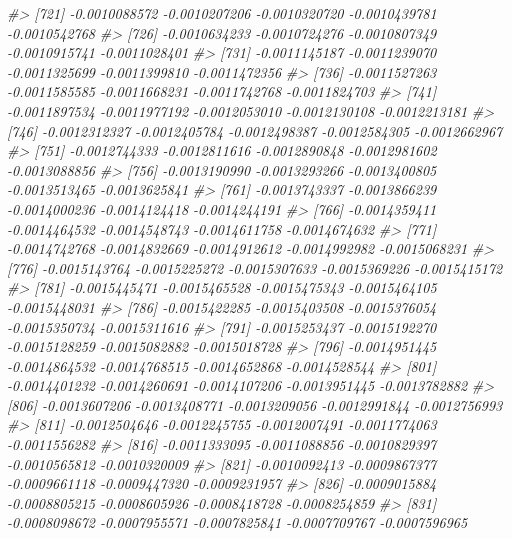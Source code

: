 \documentclass[
]{article}
\newenvironment{Shaded}{\begin{snugshade}}{\end{snugshade}}
\newcommand{\CommentTok}[1]{\textcolor[rgb]{0.56,0.35,0.01}{\textit{#1}}}
\begin{document}
\begin{Shaded}
\begin{Highlighting}[]
\CommentTok{\#\textgreater{} [721] {-}0.0010088572 {-}0.0010207206 {-}0.0010320720 {-}0.0010439781 {-}0.0010542768}
\CommentTok{\#\textgreater{} [726] {-}0.0010634233 {-}0.0010724276 {-}0.0010807349 {-}0.0010915741 {-}0.0011028401}
\CommentTok{\#\textgreater{} [731] {-}0.0011145187 {-}0.0011239070 {-}0.0011325699 {-}0.0011399810 {-}0.0011472356}
\CommentTok{\#\textgreater{} [736] {-}0.0011527263 {-}0.0011585585 {-}0.0011668231 {-}0.0011742768 {-}0.0011824703}
\CommentTok{\#\textgreater{} [741] {-}0.0011897534 {-}0.0011977192 {-}0.0012053010 {-}0.0012130108 {-}0.0012213181}
\CommentTok{\#\textgreater{} [746] {-}0.0012312327 {-}0.0012405784 {-}0.0012498387 {-}0.0012584305 {-}0.0012662967}
\CommentTok{\#\textgreater{} [751] {-}0.0012744333 {-}0.0012811616 {-}0.0012890848 {-}0.0012981602 {-}0.0013088856}
\CommentTok{\#\textgreater{} [756] {-}0.0013190990 {-}0.0013293266 {-}0.0013400805 {-}0.0013513465 {-}0.0013625841}
\CommentTok{\#\textgreater{} [761] {-}0.0013743337 {-}0.0013866239 {-}0.0014000236 {-}0.0014124418 {-}0.0014244191}
\CommentTok{\#\textgreater{} [766] {-}0.0014359411 {-}0.0014464532 {-}0.0014548743 {-}0.0014611758 {-}0.0014674632}
\CommentTok{\#\textgreater{} [771] {-}0.0014742768 {-}0.0014832669 {-}0.0014912612 {-}0.0014992982 {-}0.0015068231}
\CommentTok{\#\textgreater{} [776] {-}0.0015143764 {-}0.0015225272 {-}0.0015307633 {-}0.0015369226 {-}0.0015415172}
\CommentTok{\#\textgreater{} [781] {-}0.0015445471 {-}0.0015465528 {-}0.0015475343 {-}0.0015464105 {-}0.0015448031}
\CommentTok{\#\textgreater{} [786] {-}0.0015422285 {-}0.0015403508 {-}0.0015376054 {-}0.0015350734 {-}0.0015311616}
\CommentTok{\#\textgreater{} [791] {-}0.0015253437 {-}0.0015192270 {-}0.0015128259 {-}0.0015082882 {-}0.0015018728}
\CommentTok{\#\textgreater{} [796] {-}0.0014951445 {-}0.0014864532 {-}0.0014768515 {-}0.0014652868 {-}0.0014528544}
\CommentTok{\#\textgreater{} [801] {-}0.0014401232 {-}0.0014260691 {-}0.0014107206 {-}0.0013951445 {-}0.0013782882}
\CommentTok{\#\textgreater{} [806] {-}0.0013607206 {-}0.0013408771 {-}0.0013209056 {-}0.0012991844 {-}0.0012756993}
\CommentTok{\#\textgreater{} [811] {-}0.0012504646 {-}0.0012245755 {-}0.0012007491 {-}0.0011774063 {-}0.0011556282}
\CommentTok{\#\textgreater{} [816] {-}0.0011333095 {-}0.0011088856 {-}0.0010829397 {-}0.0010565812 {-}0.0010320009}
\CommentTok{\#\textgreater{} [821] {-}0.0010092413 {-}0.0009867377 {-}0.0009661118 {-}0.0009447320 {-}0.0009231957}
\CommentTok{\#\textgreater{} [826] {-}0.0009015884 {-}0.0008805215 {-}0.0008605926 {-}0.0008418728 {-}0.0008254859}
\CommentTok{\#\textgreater{} [831] {-}0.0008098672 {-}0.0007955571 {-}0.0007825841 {-}0.0007709767 {-}0.0007596965}

\end{Highlighting}
\end{Shaded}
\end{document}
